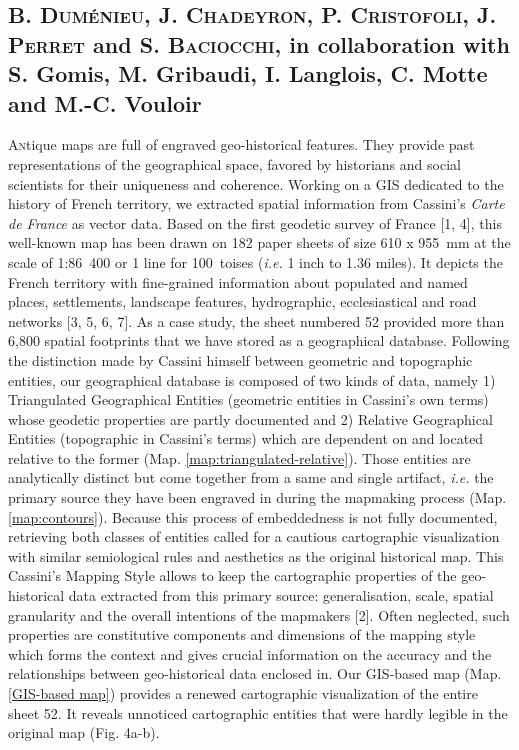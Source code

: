 \documentclass[portrait, A0]{sciposter}
\begin{document}
\begin{minipage}[b]{77cm}
\begin{multicols}{3}
\section*{\normalfont B. \textsc{Duménieu}, J. \textsc{Chadeyron}, P. \textsc{Cristofoli}, J. \textsc{Perret} and S. \textsc{Baciocchi}, in collaboration with S. Gomis, M. Gribaudi, I. Langlois, C. Motte and M.-C. Vouloir}
\lettrine{A}ntique maps are full of engraved geo-historical features. They provide past representations of the geographical space, favored by historians and social scientists for their uniqueness and coherence. Working on a GIS dedicated to the history of French territory, we extracted spatial information from Cassini’s \textit{Carte de France} as vector data. Based on the first geodetic survey of France [1, 4], this well-known map has been drawn on 182 paper sheets of size 610 x 955~mm at the scale of 1:86~400 or 1 line for 100~toises (\textit{i.e.} 1 inch to 1.36 miles). It depicts the French territory with fine-grained information about populated and named places, settlements, landscape features, hydrographic, ecclesiastical and road networks [3, 5, 6, 7]. As a case study, the sheet numbered 52 provided more than 6,800 spatial footprints that we have stored as a geographical database. Following the distinction made by Cassini himself between \og geometric \fg and \og topographic \fg entities, our geographical database is composed of two kinds of data, namely 1) Triangulated Geographical Entities (\og geometric \fg entities in Cassini’s own terms) whose geodetic properties are partly documented and 2) Relative Geographical Entities (\og topographic \fg in Cassini’s terms) which are dependent on and located relative to the former (Map. \ref{map:triangulated-relative}). Those entities are analytically distinct but come together from a same and single artifact, \emph{i.e.} the primary source they have been engraved in during the mapmaking process (Map. \ref{map:contours}). Because this process of embeddedness is not fully documented, retrieving both classes of entities called for a cautious cartographic visualization with similar semiological rules and aesthetics as the original historical map. This \og Cassini's Mapping Style \fg allows to keep the cartographic properties of the geo-historical data extracted from this primary source: generalisation, scale, spatial granularity and the overall intentions of the mapmakers [2]. Often neglected, such properties are constitutive components and dimensions of the mapping style which forms the context and gives crucial information on the accuracy and the relationships between geo-historical data enclosed in. Our GIS-based map (Map. \ref{GIS-based map}) provides a renewed cartographic visualization of the entire sheet 52. It reveals unnoticed cartographic entities that were hardly legible in the original map (Fig. 4a-b).\\
\vfill



\end{multicols}
\end{minipage}
\end{document}
